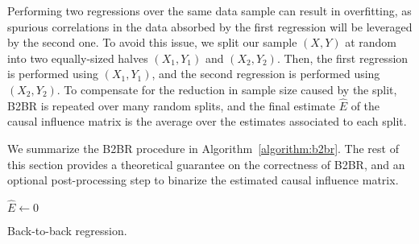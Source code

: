\documentclass{article}
\begin{document}


Performing two regressions over the same data sample can result in overfitting, as spurious correlations in the data absorbed by the first regression will be leveraged by the second one.
%
To avoid this issue, we split our sample $(X, Y)$ at random into two equally-sized halves $(X_1, Y_1)$ and $(X_2, Y_2)$.
%
Then, the first regression is performed using $(X_1, Y_1)$, and the second regression is performed using $(X_2, Y_2)$.
%
To compensate for the reduction in sample size caused by the split, B2BR is repeated over many random splits, and the final estimate $\hat E$ of the causal influence matrix is the average over the estimates associated to each split.

We summarize the B2BR procedure in Algorithm~\ref{algorithm:b2br}.
%
The rest of this section provides a theoretical guarantee on the correctness of B2BR, and an optional post-processing step to binarize the estimated causal influence matrix.



\begin{algorithm}[H]
    $\hat{E} \leftarrow 0$\;
    \caption{Back-to-back regression.}
    \label{algorithm:b2br}
\end{algorithm}
\end{document}
